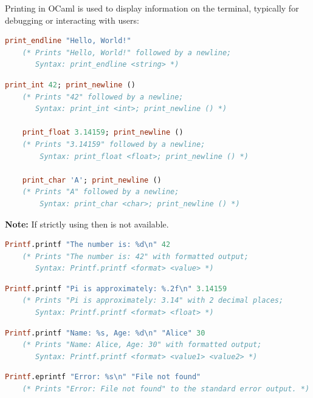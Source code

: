 \begin{Def}

    Printing in OCaml is used to display information on the terminal, typically for debugging or interacting with users:
    
    \begin{lstlisting}[language=OCaml, caption={Printing a String}, numbers=none]
    print_endline "Hello, World!"
    (* Prints "Hello, World!" followed by a newline;
       Syntax: print_endline <string> *)
    \end{lstlisting}
    
    \begin{lstlisting}[language=OCaml, caption={Printing Integers, Floats, and Characters}, numbers=none]
    print_int 42; print_newline ()
    (* Prints "42" followed by a newline;
       Syntax: print_int <int>; print_newline () *)
    
    print_float 3.14159; print_newline ()
    (* Prints "3.14159" followed by a newline;
        Syntax: print_float <float>; print_newline () *)

    print_char 'A'; print_newline ()
    (* Prints "A" followed by a newline;
        Syntax: print_char <char>; print_newline () *)
    \end{lstlisting}
    
    \textbf{Note:} If strictly using  then  is not available.
    \begin{lstlisting}[language=OCaml, caption={Formatted Printing with Printf}, numbers=none]
    Printf.printf "The number is: %d\n" 42
    (* Prints "The number is: 42" with formatted output;
       Syntax: Printf.printf <format> <value> *)
    \end{lstlisting}
    
    \begin{lstlisting}[language=OCaml, caption={Formatted Printing for Floats}, numbers=none]
    Printf.printf "Pi is approximately: %.2f\n" 3.14159
    (* Prints "Pi is approximately: 3.14" with 2 decimal places;
       Syntax: Printf.printf <format> <float> *)
    \end{lstlisting}
    
    \begin{lstlisting}[language=OCaml, caption={Printing Multiple Values}, numbers=none]
    Printf.printf "Name: %s, Age: %d\n" "Alice" 30
    (* Prints "Name: Alice, Age: 30" with formatted output;
       Syntax: Printf.printf <format> <value1> <value2> *)
    \end{lstlisting}

    
    \begin{lstlisting}[language=OCaml, caption={Using Printf.eprintf for Error Messages}, numbers=none]
    Printf.eprintf "Error: %s\n" "File not found"
    (* Prints "Error: File not found" to the standard error output. *)
    \end{lstlisting}
    
    \end{Def}
    
